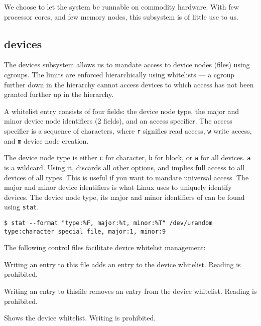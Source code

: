 We choose to let the system be runnable on commodity hardware. With few
processor cores, and few memory nodes, this subsystem is of little use to us.

\subsection{devices}

The devices subsystem allows us to mandate access to device nodes (files) using
cgroups\cite{devices.txt}. The limits are enforced hierarchically using
whitelists --- a cgroup further down in the hierarchy cannot access devices to
which access has not been granted further up in the hierarchy.

A whitelist entry consists of four fields: the device node type, the major and
minor device node identifiers (2 fields), and an access specifier. The access
specifier is a sequence of characters, where \texttt{r} signifies read access,
\texttt{w} write access, and \texttt{m} device node creation.

The device node type is either \texttt{c} for character, \texttt{b} for block,
or \texttt{a} for all devices. \texttt{a} is a wildcard. Using it, discards all
other options, and implies full access to all devices of all types. This is
useful if you want to mandate universal access. The major and minor device
identifiers is what Linux uses to uniquely identify devices.  The device node
type, its major and minor identifiers of can be found using \texttt{stat}. 

\begin{lstlisting}
$ stat --format "type:%F, major:%t, minor:%T" /dev/urandom 
type:character special file, major:1, minor:9
\end{lstlisting}

The following control files facilitate device whitelist management:

\begin{description}[\setleftmargin{0.2in}\breaklabel\setlabelstyle{\tt}]

\item[devices.allow] Writing an entry to this file adds an entry to the device
whitelist. Reading is prohibited.

\item[devices.deny] Writing an entry to thisfile removes an entry from the
device whitelist. Reading is prohibited.

\item[devices.list] Shows the device whitelist. Writing is prohibited.

\end{description}

